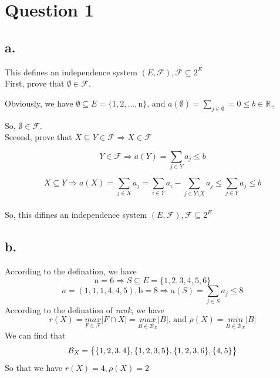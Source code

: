 \documentclass{article}
\begin{document}
\pagestyle{fancy}

\section*{Question 1}{
    \subsection*{a.}{
        This defines an independence system \((\mathit{E},\mathcal{F}), \mathcal{F} \subseteq \mathrm{2}^{\mathit{E}}\)\\

        First, prove that \(\emptyset \in \mathcal{F}\).

        Obviously, we have \(\emptyset \subseteq \mathit{E}=\{\mathrm{1,2,...,n}\}\), and \(\mathit{a}(\emptyset)=\sum_{\mathit{j} \in \emptyset}=\mathrm{0} \leqslant \mathit{b} \in \mathbb{R}_{+}\)

        So, \(\emptyset \in \mathcal{F}\).\\

        Second, prove that \(\mathit{X} \subseteq \mathit{Y} \in \mathcal{F} \Rightarrow \mathit{X} \in \mathcal{F}\)

        \[\mathit{Y} \in \mathcal{F} \Rightarrow \mathit{a}(\mathit{Y}) = \sum_{\mathit{j} \in \mathit{Y}}\mathit{a_j} \leqslant \mathit{b}\]

        \[\mathit{X} \subseteq \mathit{Y} \Rightarrow \mathit{a}(\mathit{X}) = \sum_{\mathit{j} \in \mathit{X}}\mathit{a_j} = \sum_{\mathit{i} \in \mathit{Y}}\mathit{a_i} - \sum_{\mathit{j} \in \mathit{Y} \setminus \mathit{X}}\mathit{a_j} \leqslant \sum_{\mathit{j} \in \mathit{Y}}\mathit{a_j} \leqslant \mathit{b}\]\\

        So, this difines an independence system \((\mathit{E},\mathcal{F}), \mathcal{F} \subseteq \mathrm{2}^{\mathit{E}}\)
    }
    \subsection*{b.}{
        According to the defination, we have
        \[\mathrm{n=6} \Rightarrow \mathit{S} \subseteq \mathit{E} = \{ \mathrm{1,2,3,4,5,6}\}\]
        \[\mathit{a}=\mathrm{(1,1,1,4,4,5), b=8} \Rightarrow \mathit{a}(\mathit{S}) = \sum_{\mathit{j} \in \mathit{S}}\mathit{a_j} \leqslant \mathrm{8}\]
        According to the defination of \textit{rank}, we have
        \[\mathit{r(X)}=\underset{\mathit{F} \in \mathcal{F}}{\mathit{max}} \lvert \mathit{F} \cap \mathit{X} \rvert=\underset{\mathit{B} \in \mathcal{B}_{\mathit{X}}} {\mathit{max}} \lvert \mathit{B} \rvert \text{, and } \mathit{\rho(X)} = \underset{\mathit{B} \in \mathcal{B}_{\mathit{X}}} {\mathit{min}} \lvert \mathit{B} \rvert\]
        We can find that
        \[\mathcal{B}_{\mathit{X}} = \mathrm{\big{\{} \{1,2,3,4\}, \{1,2,3,5\}, \{1,2,3,6\}, \{4,5\}\big{\}}}\]
        So that we have \(\mathit{r(X)}=\mathrm{4}, \mathit{\rho(X)}=\mathrm{2}\)
    }
}
\end{document}
